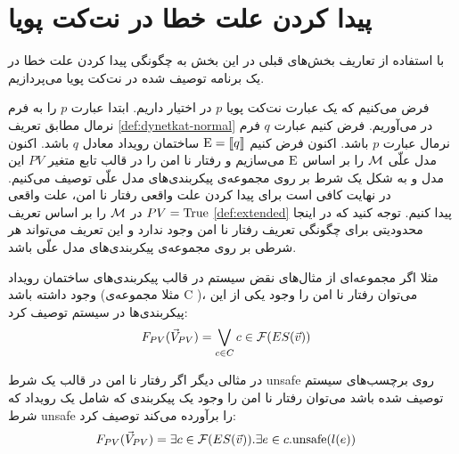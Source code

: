 \section{پیدا کردن علت خطا در نت‌کت پویا}

با استفاده از تعاریف بخش‌های قبلی در این بخش به چگونگی پیدا کردن علت خطا در یک برنامه توصیف شده در نت‌کت پویا می‌پردازیم.

فرض می‌کنیم که یک عبارت نت‌کت پویا
$p$
در اختیار داریم.
ابتدا عبارت
$p$
را به فرم نرمال مطابق تعریف 
\ref{def:dynetkat-normal}
در می‌آوریم.
فرض کنیم عبارت 
$q$
فرم نرمال
عبارت 
$p$
باشد.
اکنون فرض کنیم 
$\mathrm{E} = \llbracket q \rrbracket$
ساختمان رویداد معادل 
$q$
باشد.
اکنون مدل علّی 
$\mathcal{M}$
را بر اساس
$\mathrm{E}$
می‌سازیم و رفتار نا امن را در قالب تابع متغیر
$PV$
این مدل و به شکل یک شرط بر روی مجموعه‌ی پیکربندی‌های مدل علّی توصیف می‌کنیم.
در نهایت کافی است برای پیدا کردن علت واقعی رفتار نا امن، علت واقعی 
$PV = \mathrm{True}$
در 
$\mathcal{M}$
را بر اساس تعریف 
\ref{def:extended}
پیدا کنیم.
توجه کنید که در اینجا محدودیتی برای چگونگی تعریف رفتار نا امن وجود ندارد و این تعریف می‌تواند هر شرطی بر روی مجموعه‌ی پیکر‌بندی‌های مدل علّی باشد.

مثلا اگر مجموعه‌ای از مثال‌های نقض سیستم در قالب پیکربندی‌های ساختمان رویداد وجود داشته باشد
(مثلا مجموعه‌ی
C
)،
می‌توان رفتار نا امن را وجود یکی از این پیکربندی‌ها در سیستم توصیف کرد:
\begin{align*}
    F_{PV}(\vec V_{PV}) & = \bigvee_{c \in C} c \in \mathcal{F}(ES(\vec v))
\end{align*}

در مثالی دیگر اگر رفتار نا امن در قالب یک شرط 
unsafe
روی برچسب‌های سیستم توصیف شده باشد می‌توان رفتار نا امن را وجود یک پیکربندی که شامل یک رویداد که شرط 
unsafe
را برآورده می‌کند توصیف کرد:
\begin{align*}
    F_{PV}(\vec V_{PV}) & = \exists c \in \mathcal{F}(ES(\vec v)).\exists e \in c . \text{unsafe}(l(e))
\end{align*}



